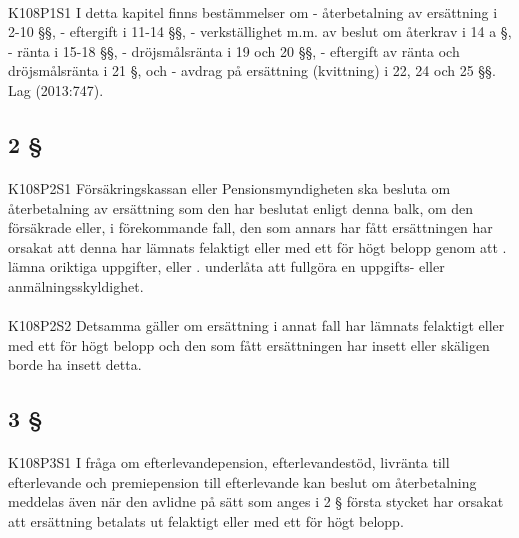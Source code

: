 \documentclass[a4paper,notitlepage,openany,10pt]{book}
\begin{document}
\paragraph*{}
{\tiny K108P1S1}
I detta kapitel finns bestämmelser om
\newline - återbetalning av ersättning i 2-10 §§,
\newline - eftergift i 11-14 §§,
\newline - verkställighet m.m. av beslut om återkrav i 14 a §,
\newline - ränta i 15-18 §§,
\newline - dröjsmålsränta i 19 och 20 §§,
\newline - eftergift av ränta och dröjsmålsränta i 21 §, och
\newline - avdrag på ersättning (kvittning) i 22, 24 och 25 §§.
Lag (2013:747).
\subsection*{2 §}
\paragraph*{}
{\tiny K108P2S1}
Försäkringskassan eller Pensionsmyndigheten ska besluta om återbetalning av ersättning som den har beslutat enligt denna balk, om den försäkrade eller, i förekommande fall, den som annars har fått ersättningen har orsakat att denna har lämnats felaktigt eller med ett för högt belopp genom att
. lämna oriktiga uppgifter, eller
. underlåta att fullgöra en uppgifts- eller anmälningsskyldighet.
\paragraph*{}
{\tiny K108P2S2}
Detsamma gäller om ersättning i annat fall har lämnats felaktigt eller med ett för högt belopp och den som fått ersättningen har insett eller skäligen borde ha insett detta.
\subsection*{3 §}
\paragraph*{}
{\tiny K108P3S1}
I fråga om efterlevandepension, efterlevandestöd, livränta till efterlevande och premiepension till efterlevande kan beslut om återbetalning meddelas även när den avlidne på sätt som anges i 2 § första stycket har orsakat att ersättning betalats ut felaktigt eller med ett för högt belopp.
\end{document}
